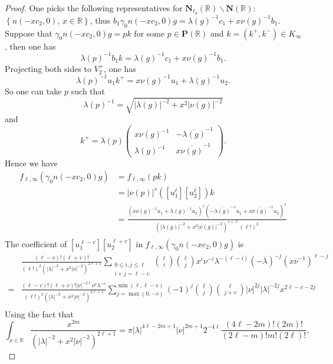 \documentclass[12pt]{article}
\theoremstyle{remark}
\theoremstyle{definition}
\newcommand{\R}{\mathbb{R}}
\newcommand{\bff}[1]{\mathbf{#1}}
\begin{document}
   \begin{proof}
    One picks the following representatives for $\bff{N}_{\ell_{0}}(\R)\backslash\bff{N}(\R)$: 
   $\left\{n(-xc_{2},0),\,x\in\R \right\}$,
   thus 
   $b_{1}\gamma_{0}n(-xc_{2},0)g=\lambda(g)^{-1}c_{1}+x\nu(g)^{-1}b_{1}$.
    Suppose that $\gamma_{0}n(-xc_{2},0)g=pk$ for some $p\in\bff{P}(\R)$ and $k=(k^{+},k^{-})\in K_{\infty}$,
    then one has 
    \[\lambda(p)^{-1}b_{1}k=\lambda(g)^{-1}c_{1}+x\nu(g)^{-1}b_{1}.\]
    Projecting both sides to $V_{2}^{+}$,
    one has 
    \[\lambda(p)^{-1}u_{1}k^{+}=x\nu(g)^{-1}u_{1}+\lambda(g)^{-1}u_{2}.\]
    So one can take $p$ such that 
    \[\lambda(p)^{-1}=\sqrt{|\lambda(g)|^{-2}+x^{2}|\nu(g)|^{-2}}\]
    and 
    \[k^{+}=\lambda(p)\left(\begin{matrix}
        x\nu(g)^{-1} & -\overline{\lambda(g)}^{-1}\\
        \lambda(g)^{-1} & x\overline{\nu(g)}^{-1}
    \end{matrix}\right)
    .
    \]
    Hence we have 
    \begin{align*}
        f_{\ell,\infty}(\gamma_{0}n(-xc_{2},0)g)&=f_{\ell,\infty}(pk)\\
        &=|\nu(p)|^{s}([u_{1}^{\ell}][u_{2}^{\ell}])k\\
        &=\frac{(x\nu(g)^{-1}u_{1}+\lambda(g)^{-1}u_{2})^{\ell}(-\overline{\lambda(g)}^{-1}u_{1}+x\overline{\nu(g)}^{-1}u_{2})^{\ell}}{(|\lambda(g)|^{-2}+x^{2}|\nu(g)|^{-2})^{s+\ell}(\ell!)^{2}}\\
    \end{align*}
    The coefficient of $[u_{1}^{\ell-v}][u_{2}^{\ell+v}]$ in $f_{\ell,\infty}(\gamma_{0}n(-xc_{2},0)g)$ is 
    \begin{align*}
        &\frac{(\ell-v)!(\ell+v)!}{(\ell!)^{2}(|\lambda|^{-2}+x^{2}|\nu|^{-2})^{2\ell+1}}\sum_{\substack{0\leq i,j\leq \ell\\ i+j=\ell-v}}\binom{\ell}{i}\binom{\ell}{j}x^{i}\nu^{-i}\lambda^{-(\ell-i)}(-\overline{\lambda})^{-j}(x\overline{\nu}^{-1})^{\ell-j}\\
        =&\frac{(\ell-v)!(\ell+v)!|\nu|^{-2\ell}\nu^{v}\lambda^{-v}}{(\ell!)^{2}(|\lambda|^{-2}+x^{2}|\nu|^{-2})^{2\ell+1}}\sum_{j=\max(0,-v)}^{\min(\ell,\ell-v)}(-1)^{j}\binom{\ell}{j}\binom{\ell}{j+v}|\nu|^{2j}|\lambda|^{-2j}x^{2\ell-v-2j}\\
    \end{align*}
    Using the fact that 
    \[\int_{x\in\R}\frac{x^{2m}}{(|\lambda|^{-2}+x^{2}|\nu|^{-2})^{2\ell+1}}=\pi|\lambda|^{4\ell-2m+1}|\nu|^{2m+1}2^{-4\ell}\frac{(4\ell-2m)!(2m)!}{(2\ell-m)!m!(2\ell)!},\]

\end{proof}
\end{document}

